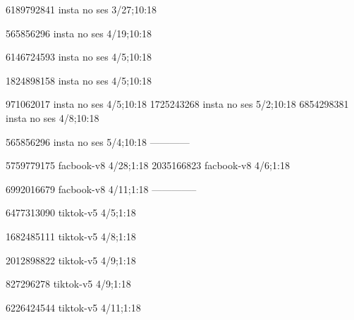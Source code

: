 6189792841 insta no ses
3/27;10:18

565856296 insta no ses
4/19;10:18

6146724593 insta no ses
4/5;10:18

1824898158 insta no ses
4/5;10:18

971062017 insta no ses
4/5;10:18
1725243268 insta no ses
5/2;10:18
6854298381 insta no ses
4/8;10:18

565856296 insta no ses
5/4;10:18
------------


5759779175 facbook-v8
4/28;1:18
2035166823 facbook-v8
4/6;1:18

6992016679 facbook-v8
4/11;1:18
--------------



6477313090 tiktok-v5
4/5;1:18

1682485111 tiktok-v5
4/8;1:18

2012898822 tiktok-v5
4/9;1:18

827296278 tiktok-v5
4/9;1:18

6226424544 tiktok-v5
4/11;1:18
